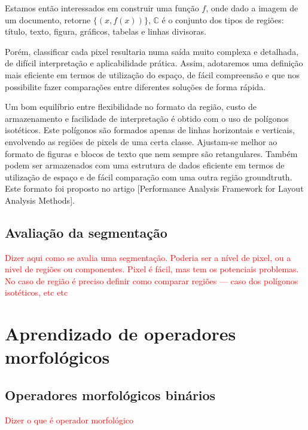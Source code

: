 \documentclass[a4paper,11pt]{article}
\newcommand{\TODO}[1]{\textcolor{red}{#1}}
\begin{document}
    Estamos então interessados em construir uma função $f$, onde dado
    a imagem de um documento, retorne $\lbrace (x, f(x)) \rbrace$,
    $\mathbb{C}$ é o conjunto dos tipos de regiões: título, texto,
    figura, gráficos, tabelas e linhas divisoras.

    Porém, classificar cada pixel resultaria numa saída muito complexa
    e detalhada, de difícil interpretação e aplicabilidade
    prática. Assim, adotaremos uma definição mais eficiente em termos
    de utilização do espaço, de fácil compreensão e que nos
    possibilite fazer comparações entre diferentes soluções de forma
    rápida.


    Um bom equilíbrio entre flexibilidade no formato da região, custo
    de armazenamento e facilidade de interpretação é obtido com o uso
    de polígonos isotéticos. Este polígonos são formados apenas de
    linhas horizontais e verticais, envolvendo as regiões de pixels de
    uma certa classe. Ajustam-se melhor ao formato de figuras e blocos
    de texto que nem sempre são retangulares. Também podem ser
    armazenados com uma estrutura de dados eficiente em termos de
    utilização de espaço e de fácil comparação com uma outra região
    groundtruth. Este formato foi proposto no artigo [Performance
      Analysis Framework for Layout Analysis Methods].


\subsection{Avaliação da segmentação}

\TODO{Dizer aqui como se avalia uma segmentação. Poderia ser a nível
  de pixel, ou a nivel de regiões ou componentes. Pixel é fácil, mas
  tem os potenciais problemas. No caso de região é preciso definir
  como comparar regiões --- caso dos polígonos isotéticos, etc etc}






\section{Aprendizado de operadores morfológicos}

\subsection{Operadores morfológicos binários}

\TODO{Dizer o que é operador morfológico}
\end{document}
